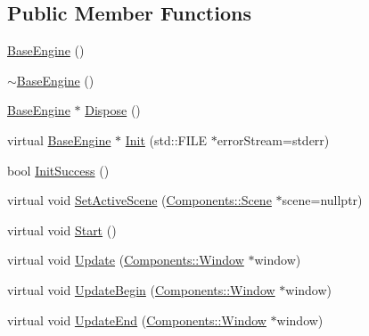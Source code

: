 \subsection*{Public Member Functions}
\begin{DoxyCompactItemize}
\item 
\mbox{\hyperlink{classEngine_1_1BaseEngine_ad838c97afe1790cb35527f0b58e81e6b}{Base\+Engine}} ()
\item 
\mbox{\hyperlink{classEngine_1_1BaseEngine_a8a3ba672021058958d66af5ee432beac}{$\sim$\+Base\+Engine}} ()
\item 
\mbox{\hyperlink{classEngine_1_1BaseEngine}{Base\+Engine}} $\ast$ \mbox{\hyperlink{classEngine_1_1BaseEngine_acd5cd5d2189d24e038b23477b7dce405}{Dispose}} ()
\item 
virtual \mbox{\hyperlink{classEngine_1_1BaseEngine}{Base\+Engine}} $\ast$ \mbox{\hyperlink{classEngine_1_1BaseEngine_ad9c141fe48c8c91e14e77ed5fcb90196}{Init}} (std\+::\+F\+I\+LE $\ast$error\+Stream=stderr)
\item 
bool \mbox{\hyperlink{classEngine_1_1BaseEngine_a7a1c9b833049b3eb61194cab113dfe89}{Init\+Success}} ()
\item 
virtual void \mbox{\hyperlink{classEngine_1_1BaseEngine_afc82c6a00d5a9d4714740fc5eab5db86}{Set\+Active\+Scene}} (\mbox{\hyperlink{classEngine_1_1Components_1_1Scene}{Components\+::\+Scene}} $\ast$scene=nullptr)
\item 
virtual void \mbox{\hyperlink{classEngine_1_1BaseEngine_a525fdc7a1da7eecb514ad5763f06be79}{Start}} ()
\item 
virtual void \mbox{\hyperlink{classEngine_1_1BaseEngine_a01c23c2073f08939a660f3b7a866852c}{Update}} (\mbox{\hyperlink{classEngine_1_1Components_1_1Window}{Components\+::\+Window}} $\ast$window)
\item 
virtual void \mbox{\hyperlink{classEngine_1_1BaseEngine_aace6be2a42d12b64fbd35f1acdb08408}{Update\+Begin}} (\mbox{\hyperlink{classEngine_1_1Components_1_1Window}{Components\+::\+Window}} $\ast$window)
\item 
virtual void \mbox{\hyperlink{classEngine_1_1BaseEngine_a7c07c98e583df042a0eb01e0ddec85a1}{Update\+End}} (\mbox{\hyperlink{classEngine_1_1Components_1_1Window}{Components\+::\+Window}} $\ast$window)
\end{DoxyCompactItemize}

